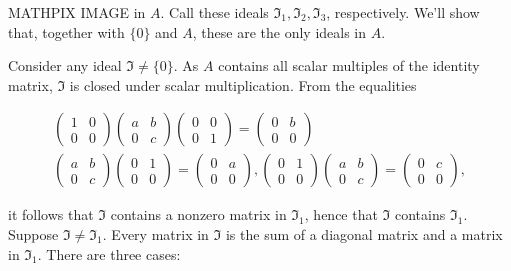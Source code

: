 \documentclass[10pt]{article}
\begin{document}
MATHPIX IMAGE
in $A$. Call these ideals $\mathfrak{I}_{1}, \mathfrak{I}_{2}, \mathfrak{I}_{3}$, respectively. We'll show that, together with $\{0\}$ and $A$, these are the only ideals in $A$.

Consider any ideal $\mathfrak{I} \neq\{0\}$. As $A$ contains all scalar multiples of the identity matrix, $\mathfrak{I}$ is closed under scalar multiplication. From the equalities

$$
\begin{gathered}
\left(\begin{array}{ll}
1 & 0 \\
0 & 0
\end{array}\right)\left(\begin{array}{ll}
a & b \\
0 & c
\end{array}\right)\left(\begin{array}{ll}
0 & 0 \\
0 & 1
\end{array}\right)=\left(\begin{array}{ll}
0 & b \\
0 & 0
\end{array}\right) \\
\left(\begin{array}{ll}
a & b \\
0 & c
\end{array}\right)\left(\begin{array}{ll}
0 & 1 \\
0 & 0
\end{array}\right)=\left(\begin{array}{ll}
0 & a \\
0 & 0
\end{array}\right),\left(\begin{array}{ll}
0 & 1 \\
0 & 0
\end{array}\right)\left(\begin{array}{ll}
a & b \\
0 & c
\end{array}\right)=\left(\begin{array}{ll}
0 & c \\
0 & 0
\end{array}\right),
\end{gathered}
$$

it follows that $\mathfrak{I}$ contains a nonzero matrix in $\mathfrak{I}_{1}$, hence that $\mathfrak{I}$ contains $\mathfrak{I}_{1}$. Suppose $\mathfrak{I} \neq \mathfrak{I}_{1}$. Every matrix in $\mathfrak{I}$ is the sum of a diagonal matrix and a matrix in $\mathfrak{I}_{1}$. There are three cases:
\end{document}
